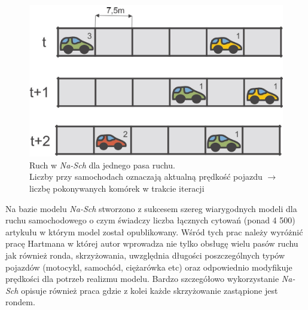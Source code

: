 \documentclass[a4paper,11pt]{article}
\begin{document}
\begin{enumerate}
\begin{large}
			\begin{figure}[!htb]
				\centering
				\captionsetup{justification=centering,margin=2cm}
				\includegraphics[scale=0.35]{Na-Sch.jpg}

				\caption{Ruch w \textit{Na-Sch} dla jednego pasa ruchu. \\Liczby przy samochodach oznaczają aktualną prędkość pojazdu $\rightarrow$ liczbę pokonywanych komórek w trakcie iteracji}
			\end{figure}
			
	\newpage			
			
			Na bazie modelu \textit{Na-Sch} stworzono z sukcesem szereg wiarygodnych modeli dla ruchu samochodowego o czym świadczy liczba łącznych cytowań (ponad 4 500) artykułu w którym model został opublikowany. Wśród tych prac należy wyróżnić pracę Hartmana \cite{hartman2004head} w której autor wprowadza nie tylko obsługę wielu pasów ruchu jak również ronda, skrzyżowania, uwzględnia długości poszczególnych typów pojazdów (motocykl, samochód, ciężarówka etc) oraz odpowiednio modyfikuje prędkości dla potrzeb realizmu modelu. Bardzo szczegółowo wykorzystanie \textit{Na-Sch} opisuje również praca \cite{regragui2018cellular} gdzie z kolei każde skrzyżowanie zastąpione jest rondem.\\
			

\end{large}
\end{enumerate}
\end{document}
